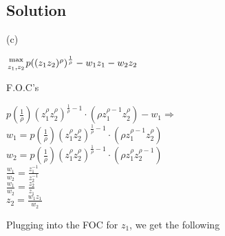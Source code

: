 \documentclass[10pt, a4paper]{article}
\begin{document}
    \subsection{Solution}
      (c) 
      \begin{center}
        ${\max \atop{z_1,z_2}} p((z_1z_2)^{\rho})^{\frac{1}{\rho}}-w_1z_1-w_2z_2$ \\ 
      \end{center}
      F.O.C's
      \begin{center}
        $p(\frac{1}{\rho})(z_1^{\rho}z_2^{\rho})^{\frac{1}{\rho}-1}\cdot(\rho z_1^{\rho-1}z_2^{\rho})-w_1 \Rightarrow$ \\
        $w_1 = p(\frac{1}{\rho})(z_1^{\rho}z_2^{\rho})^{\frac{1}{\rho}-1}\cdot(\rho z_1^{\rho-1}z_2^{\rho})$ \\
        $w_2 = p(\frac{1}{\rho})(z_1^{\rho}z_2^{\rho})^{\frac{1}{\rho}-1}\cdot(\rho z_1^{\rho}z_2^{\rho-1})$ \\ 
        $\frac{w_1}{w_2}=\frac{z_1^{-1}}{z_2^{-1}}$ \\
        $\frac{w_1}{w_2}=\frac{z_2}{z_1}$ \\
        $z_2 = \frac{w_1z_1}{w_2}$ \\
      \end{center}
      Plugging into the FOC for $z_1$, we get the following
\end{document}
